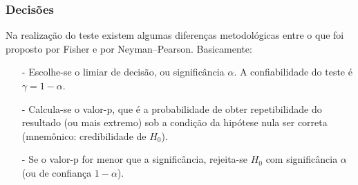 \documentclass[graphics,14pt]{beamer}
\begin{document}
\begin{frame}[t,fragile=singleslide]
\frametitle{Decisões}
	Na realização do teste existem algumas diferenças metodológicas entre o que foi proposto por Fisher e por Neyman–Pearson. 
	Basicamente:
	\begin{itemize}
		\item[-]  Escolhe-se o limiar de decisão, ou significância $\alpha$. A confiabilidade do teste é $\gamma = 1 - \alpha$.
		\item[-] Calcula-se o valor-p, que é a probabilidade de obter repetibilidade do resultado (ou mais extremo) sob a condição da hipótese nula ser correta (mnemônico: credibilidade de $H_0$).
		\item[-] Se o valor-p for menor que a significância, rejeita-se $H_0$ com significância $\alpha$ (ou de confiança $1-\alpha$).
	\end{itemize} 
\end{frame}	
\end{document}
